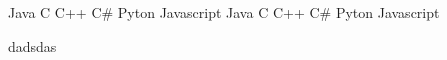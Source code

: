 \documentclass[11pt, a4paper]{cv}
\begin{document}
\begin{multicols}{4}
	\noindent
	Java \newline
	C \newline
	C++ \newline
	C\# \newline
	Pyton \newline
	Javascript \newline
	\faCircle\faCircle\faCircle\faCircle\faCircle \newline
	\faCircle\faCircle\faCircle\faCircle\faCircle \newline
	\faCircle\faCircle\faCircle\faCircle\faCircle \newline
	\faCircle\faCircle\faCircle\faCircle\faCircle \newline
	\faCircle\faCircle\faCircle\faCircle\faCircle \newline
	\faCircle\faCircle\faCircle\faCircle\faCircle \newline
	Java \newline
	C \newline
	C++ \newline
	C\# \newline
	Pyton \newline
	Javascript \newline
	\faCircle\faCircle\faCircle\faCircle\faCircle \newline
	\faCircle\faCircle\faCircle\faCircle\faCircle \newline
	\faCircle\faCircle\faCircle\faCircle\faCircle \newline
	\faCircle\faCircle\faCircle\faCircle\faCircle \newline
	\faCircle\faCircle\faCircle\faCircle\faCircle \newline
	\faCircle\faCircle\faCircle\faCircle\faCircle
\end{multicols}


dadsdas
\end{document}
